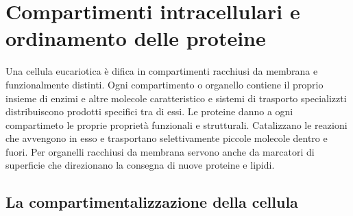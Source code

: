 \chapter{Compartimenti intracellulari e ordinamento delle proteine}
Una cellula eucariotica \`e difica in compartimenti racchiusi da membrana e funzionalmente distinti. Ogni compartimento o organello contiene il proprio insieme di enzimi e altre molecole
caratteristico e sistemi di trasporto specializzti distribuiscono prodotti specifici tra di essi. Le proteine danno a ogni compartimeto le proprie propriet\`a funzionali e strutturali.
Catalizzano le reazioni che avvengono in esso e trasportano selettivamente piccole molecole dentro e fuori. Per organelli racchiusi da membrana servono anche da marcatori di superficie
che direzionano la consegna di nuove proteine e lipidi. 
\section{La compartimentalizzazione della cellula}
